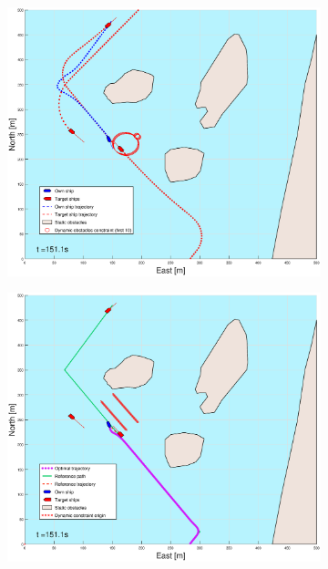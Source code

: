 \begin{figure}[ht]
\begin{subfigure}[b]{0.499\textwidth}
    \end{subfigure}
    \hfill
    \\ 
    \begin{subfigure}[b]{0.49\textwidth}
        \centering
        \includegraphics[width=\textwidth]{Images/Figures/Helloya_Rev/_Simple_0fig1_time=151}
    \end{subfigure}
    \hfill
    \begin{subfigure}[b]{0.499\textwidth}
        \centering
        \includegraphics[width=\textwidth]{Images/Figures/Helloya_Rev/_Simple_0fig999_time=151}
    \end{subfigure}
    \hfill
\end{figure}
